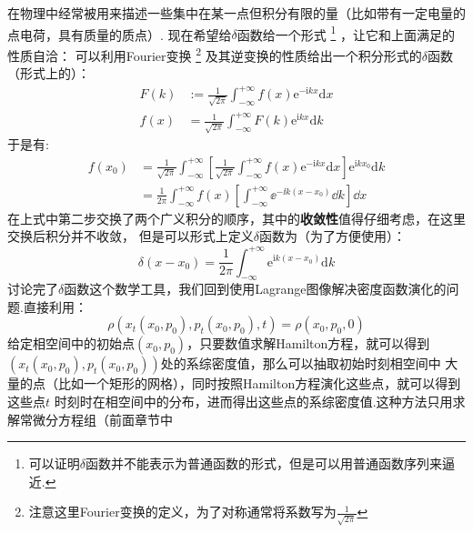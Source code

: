     在物理中经常被用来描述一些集中在某一点但积分有限的量（比如带有一定电量的点电荷，具有质量的质点）.
    现在希望给$\delta$函数给一个形式
    \footnote{
        可以证明$\delta$函数并不能表示为普通函数的形式，但是可以用普通函数序列来逼近.
    }
    ，让它和上面满足的性质自洽：
    可以利用Fourier变换
    \footnote{注意这里Fourier变换的定义，为了对称通常将系数写为$\frac{1}{\sqrt{2\pi}}$}
    及其逆变换的性质给出一个积分形式的$\delta$函数（形式上的）：
    \begin{equation}
        \begin{split}
            F(k) &:= \frac 1{\sqrt{2\pi}} \int_{-\infty}^{+\infty} f(x)\mathrm{e}^{-\mathrm{i}kx}\mathrm{d}x\\
            f(x) &= \frac 1{\sqrt{2\pi}} \int_{-\infty}^{+\infty} F(k)\mathrm{e}^{\mathrm{i}kx}\mathrm{d}k
        \end{split}
        \label{fourier transform}
    \end{equation}
    于是有:
    \begin{equation}
        \begin{split}
            f(x_0) &= \frac 1{\sqrt{2\pi}} \int_{-\infty}^{+\infty}\left[\frac 1{\sqrt{2\pi}} 
            \int_{-\infty}^{+\infty} f(x)\mathrm{e}^{-\mathrm{i}kx}\mathrm{d}x\right] \mathrm{e}^{\mathrm{i}kx_0}\mathrm{d}k\\
            &= \frac 1{2\pi} \int_{-\infty}^{+\infty}f(x)\left[\int_{-\infty}^{+\infty}\ee^{-\ii k(x - x_0)}\dd k\right]\dd x
        \end{split}
    \end{equation}
    在上式中第二步交换了两个广义积分的顺序，其中的\textbf{收敛性}值得仔细考虑，在这里交换后积分并不收敛，
    但是可以形式上定义$\delta$函数为（为了方便使用）：
    \begin{equation}
        \delta(x-x_0) = \frac 1{2\pi} \int_{-\infty}^{+\infty} \mathrm{e}^{\mathrm{i}k(x-x_0)}\mathrm{d}k
        \label{integral formation of delta function}
    \end{equation}
    讨论完了$\delta$函数这个数学工具，我们回到使用Lagrange图像解决密度函数演化的问题.直接利用：
    \begin{equation}
        \rho(x_t(x_0, p_0), p_t(x_0, p_0), t) = \rho(x_0, p_0, 0)
    \end{equation}
    给定相空间中的初始点$(x_0, p_0)$，只要数值求解Hamilton方程，就可以得到
    $(x_t(x_0, p_0), p_t(x_0, p_0))$处的系综密度值，那么可以抽取初始时刻相空间中
    大量的点（比如一个矩形的网格），同时按照Hamilton方程演化这些点，就可以得到这些点$t$
    时刻时在相空间中的分布，进而得出这些点的系综密度值.这种方法只用求解常微分方程组（前面章节中
